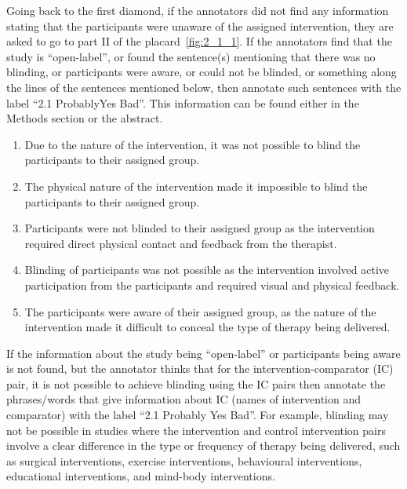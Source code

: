 \documentclass[sn-mathphys,Numbered]{sn-jnl}%
\begin{document}
Going back to the first diamond, if the annotators did not find any information stating that the participants were unaware of the assigned intervention, they are asked to go to part II of the placard~\ref{fig:2_1_1}.
If the annotators find that the study is ``open-label'', or found the sentence(s) mentioning that there was no blinding, or participants were aware, or could not be blinded, or something along the lines of the sentences mentioned below, then annotate such sentences with the label ``2.1 ProbablyYes Bad''.
This information can be found either in the Methods section or the abstract.
\begin{enumerate}
    \item Due to the nature of the intervention, it was not possible to blind the participants to their assigned group.
    \item The physical nature of the intervention made it impossible to blind the participants to their assigned group.
    \item Participants were not blinded to their assigned group as the intervention required direct physical contact and feedback from the therapist.
    \item Blinding of participants was not possible as the intervention involved active participation from the participants and required visual and physical feedback.
    \item The participants were aware of their assigned group, as the nature of the intervention made it difficult to conceal the type of therapy being delivered.
\end{enumerate}
%
%
%
If the information about the study being ``open-label'' or participants being aware is not found, but the annotator thinks that for the intervention-comparator (IC) pair, it is not possible to achieve blinding using the IC pairs then annotate the phrases/words that give information about IC (names of intervention and comparator) with the label ``2.1 Probably Yes Bad''.
For example, blinding may not be possible in studies where the intervention and control intervention pairs involve a clear difference in the type or frequency of therapy being delivered, such as surgical interventions, exercise interventions, behavioural interventions, educational interventions, and mind-body interventions.
%
%
%
\end{document}
